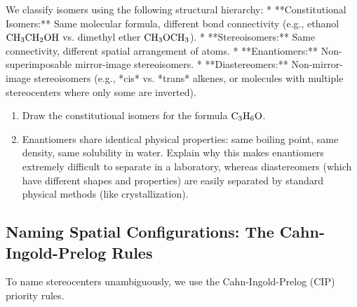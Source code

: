 \documentclass[12pt, a4paper]{book}
\begin{document}
\begin{explobox}
We classify isomers using the following structural hierarchy:
* **Constitutional Isomers:** Same molecular formula, different bond connectivity (e.g., ethanol $\ce{CH3CH2OH}$ vs. dimethyl ether $\ce{CH3OCH3}$).
* **Stereoisomers:** Same connectivity, different spatial arrangement of atoms.
  * **Enantiomers:** Non-superimposable mirror-image stereoisomers.
  * **Diastereomers:** Non-mirror-image stereoisomers (e.g., *cis* vs. *trans* alkenes, or molecules with multiple stereocenters where only some are inverted).
\begin{enumerate}[label=(\alph*), leftmargin=*]
  \item Draw the constitutional isomers for the formula $\ce{C3H6O}$.
  \item Enantiomers share identical physical properties: same boiling point, same density, same solubility in water.
        Explain why this makes enantiomers extremely difficult to separate in a laboratory, whereas diastereomers (which have different shapes and properties) are easily separated by standard physical methods (like crystallization).
\end{enumerate}
\end{explobox}

\subsection{Naming Spatial Configurations: The Cahn-Ingold-Prelog Rules}

To name stereocenters unambiguously, we use the Cahn-Ingold-Prelog (CIP) priority rules.
\end{document}
